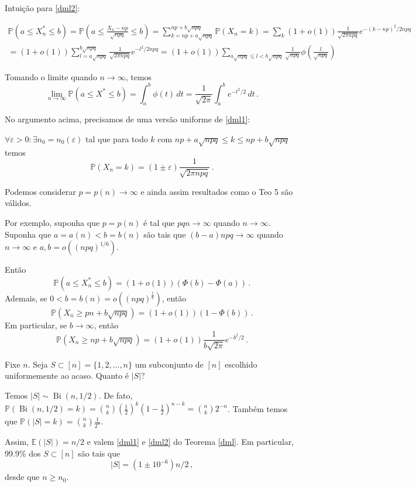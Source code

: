 Intuição para \ref{dml2}:

\begin{multline*}
	\mathbb{P}(a\leq X_n^{*}\leq b) = 
	\mathbb{P}(a\leq \frac{X_n-np}{\sqrt{npq}}\leq b) = \sum_{k=np+a\sqrt{npq}}^{np+b\sqrt{npq}}\mathbb{P}(X_n = k)  = 
	\sum_{k}(1+o(1))\frac{1}{\sqrt{2\pi npq}}e^{-(k-np)^2/2npq}\\ = (1+o(1))\sum_{l=a\sqrt{npq}}^{b\sqrt{npq}}\frac{1}{\sqrt{2\pi npq}}e^{-l^2/2npq} = (1+o(1))\sum_{a\sqrt{npq}\leq l < b\sqrt{npq}}\frac{1}{\sqrt{npq}}\phi\left(\frac{l}{\sqrt{npq}}\right)
\end{multline*}

Tomando o limite quando $n\rightarrow\infty$, temos
\[
	\lim_{n\rightarrow\infty}\mathbb{P}(a\leq X^{*}\leq b) = \int_{a}^{b}\phi(t)\,dt = \frac{1}{\sqrt{2\pi}}\int_{a}^{b}e^{-t^2/2}\,dt\,.
\]


\begin{observacao}
	No argumento acima, precisamos de uma versão uniforme de \ref{dml1}:
	
	$\forall\varepsilon>0:\exists n_0 = n_0(\varepsilon)$ tal que para todo $k$ com $np+a\sqrt{npq}\leq k\leq np+b\sqrt{npq}$ temos
	\[
	\mathbb{P}(X_n = k) = (1\pm\varepsilon)\frac{1}{\sqrt{2\pi npq}}\,.
	\] 
	
	
	
\end{observacao}
	
Podemos considerar $p = p(n)\rightarrow \infty$ e ainda assim resultados como o Teo 5 são válidos.
	
Por exemplo, suponha que $p = p(n)$ é tal que $pqn\rightarrow\infty$ quando $n\rightarrow\infty$.
Suponha que $a = a(n) < b = b(n)$ são tais que $(b-a)npq\rightarrow\infty$ quando $n\rightarrow\infty$ e $a,b = o((npq)^{1/6})$.
	
Então
\[
	\mathbb{P}(a\leq X_n^{*}\leq b) = (1+o(1))(\Phi(b) - \Phi(a))\,.
\]
Ademais, se $0<b = b(n) = o((npq)^{\frac{1}{6}})$, então
\[
	\mathbb{P}(X_n\geq pn + b\sqrt{npq}) = (1+o(1))(1-\Phi(b))\,.
\]
Em particular, se $b\rightarrow\infty$, então
\[
	\mathbb{P}(X_n\geq np+b\sqrt{npq}) = (1+o(1))\frac{1}{b\sqrt{2\pi}}e^{-b^2/2}\,.
\]

\begin{exemplo}
	Fixe $n$. Seja $S \subset [n] = \{1,2,\dotsc,n\}$ um subconjunto de $[n]$ escolhido uniformemente ao acaso. Quanto é $|S|$?
	
	Temos $|S|\sim \operatorname{Bi}(n,1/2)$. De fato, $\mathbb{P}(\operatorname{Bi}(n,1/2) = k) = \binom{n}{k}(\frac{1}{2})^k(1-\frac{1}{2})^{n-k} = \binom{n}{k}2^{-n}$. Também temos que $\mathbb{P}(|S| = k) = \binom{n}{k}\frac{1}{2^n}$.
	
	Assim, $\mathbb{E}(|S|) = n/2$ e valem \ref{dml1} e \ref{dml2} do Teorema \ref{dml}. Em particular, 99.9\% dos $S\subset[n]$ são tais que
	\[
		|S| = (1\pm10^{-6})n/2\,,
	\]
	desde que $n\geq n_0$.
\end{exemplo}	

